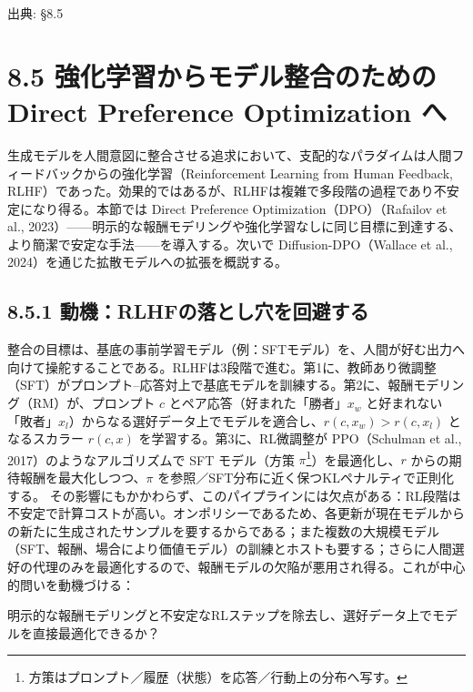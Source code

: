 

{\color{gray}\footnotesize 出典: §8.5\par}
\vspace{0.2em}

\section*{8.5 強化学習からモデル整合のための Direct Preference Optimization へ}


生成モデルを人間意図に整合させる追求において、支配的なパラダイムは人間フィードバックからの強化学習（Reinforcement Learning from Human Feedback, RLHF）であった。効果的ではあるが、RLHFは複雑で多段階の過程であり不安定になり得る。本節では Direct Preference Optimization（DPO）（Rafailov et al., 2023）——明示的な報酬モデリングや強化学習なしに同じ目標に到達する、より簡潔で安定な手法——を導入する。次いで Diffusion-DPO（Wallace et al., 2024）を通じた拡散モデルへの拡張を概説する。

\subsection*{8.5.1 動機：RLHFの落とし穴を回避する}


整合の目標は、基底の事前学習モデル（例：SFTモデル）を、人間が好む出力へ向けて操舵することである。RLHFは3段階で進む。第1に、教師あり微調整（SFT）がプロンプト–応答対上で基底モデルを訓練する。第2に、報酬モデリング（RM）が、プロンプト $c$ とペア応答（好まれた「勝者」$x_w$ と好まれない「敗者」$x_l$）からなる選好データ上でモデルを適合し、$r(c,x_w)>r(c,x_l)$ となるスカラー $r(c,x)$ を学習する。第3に、RL微調整が PPO（Schulman et al., 2017）のようなアルゴリズムで SFT モデル（方策 $\pi$\footnote{方策はプロンプト／履歴（状態）を応答／行動上の分布へ写す。}）を最適化し、$r$ からの期待報酬を最大化しつつ、$\pi$ を参照／SFT分布に近く保つKLペナルティで正則化する。
その影響にもかかわらず、このパイプラインには欠点がある：RL段階は不安定で計算コストが高い。オンポリシーであるため、各更新が現在モデルからの新たに生成されたサンプルを要するからである；また複数の大規模モデル（SFT、報酬、場合により価値モデル）の訓練とホストも要する；さらに人間選好の代理のみを最適化するので、報酬モデルの欠陥が悪用され得る。これが中心的問いを動機づける：

\begin{propositionbox}[問い 8.5.1]
明示的な報酬モデリングと不安定なRLステップを除去し、選好データ上でモデルを直接最適化できるか？
\end{propositionbox}


